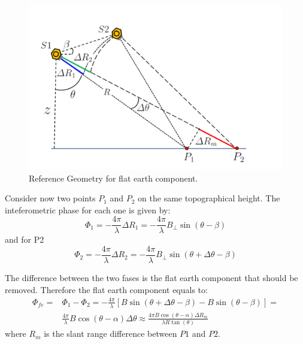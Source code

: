 \begin{figure}[H]
    \centering
    \includegraphics[width=\linewidth]{Cap1/flat.png}
    \caption{Reference Geometry for flat earth component. \cite{Paolathesis}}
    \label{fig:flat_earth_component}
\end{figure}

Consider now two points $P_1$ and $P_2$ on the same topographical height. The inteferometric phase for each one is given by:
\begin{equation}
    \Phi_1 = -\frac{4\pi}{\lambda}\Delta R_1 = -\frac{4\pi}{\lambda}B_{\perp}\sin(\theta - \beta)
\end{equation}
and for P2
\begin{equation}
    \Phi_2 = -\frac{4\pi}{\lambda}\Delta R_2 = -\frac{4\pi}{\lambda}B_{\perp}\sin(\theta + \Delta \theta - \beta)
\end{equation}

The difference between the two fases is the flat earth component that should be removed. Therefore the flat earth component equals to:
\begin{equation}
    \begin{aligned}
        \Phi_{fe} = & \Phi_1 - \Phi_2 = -\frac{4\pi}{\lambda}[B\sin(\theta + \Delta \theta - \beta) - B\sin(\theta - \beta)] = \\ 
        & \frac{4\pi}{\lambda}B\cos(\theta - \alpha)\Delta \theta
        \approx \frac{4\pi B\cos(\theta - \alpha)\Delta R_m}{\lambda R \tan(\theta)}
    \end{aligned}
\end{equation}
where $R_m$ is the slant range difference between $P1$ and $P2$.

